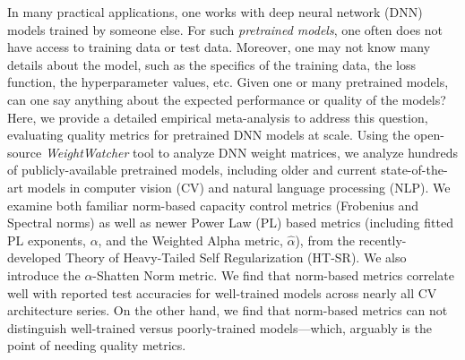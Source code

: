 
In many practical applications, one works with deep neural network (DNN) models trained by someone else.
For such \emph{pretrained models}, one often does not have access to training data or test data.
Moreover, one may not know many details about the model, such as the specifics of the training data, the loss function, the hyperparameter values, etc.
Given one or many pretrained models, can one say anything about the expected performance or quality of the models?
Here, we provide a detailed empirical meta-analysis to address this question, evaluating quality metrics for pretrained DNN models at scale.
%
Using the open-source \emph{WeightWatcher} tool to analyze DNN weight matrices, we analyze hundreds of publicly-available pretrained models, including older and current state-of-the-art models in computer vision (CV) and natural language processing (NLP).
We examine both familiar norm-based capacity control metrics (Frobenius and Spectral norms) as well as newer Power Law (PL) based metrics (including fitted PL exponents, $\alpha$, and the Weighted Alpha metric, $\hat{\alpha}$), from the recently-developed Theory of Heavy-Tailed Self Regularization (HT-SR).
We also introduce the $\alpha$-Shatten Norm metric.
We find that norm-based metrics correlate well with reported test accuracies for well-trained models across nearly all CV architecture series.
On the other hand, we find that norm-based metrics can not distinguish well-trained versus poorly-trained models---which, arguably is the point of needing quality metrics.  
